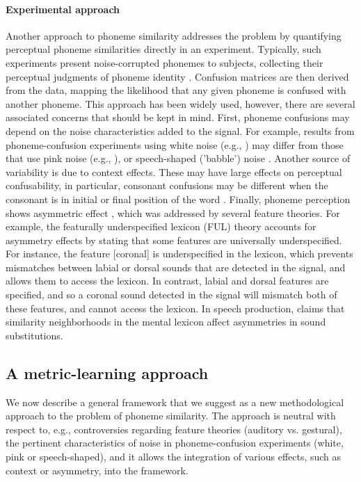\paragraph{Experimental approach}
Another approach to phoneme similarity addresses the problem by quantifying perceptual phoneme similarities directly in an experiment. Typically, such experiments present noise-corrupted phonemes to subjects, collecting their perceptual judgments of phoneme identity \citep{NicelyMiller1955}. Confusion matrices are then derived from the data, mapping the likelihood that any given phoneme is confused with another phoneme. This approach has been widely used, however, there are several associated concerns that should be kept in mind. First, phoneme confusions may depend on the noise characteristics added to the signal. For example, results from phoneme-confusion experiments using white noise (e.g., \citealp{NicelyMiller1955, Luce1987}) may differ from those that use pink noise (e.g., \citealp{redford1999relative}), or speech-shaped ('babble') noise \citep{cutler2004patterns}. Another source of variability is due to context effects. These may have large effects on perceptual confusability, in particular, consonant confusions may be different when the consonant is in initial or final position of the word \citep{Luce1987, hura1992role, redford1999relative}. Finally, phoneme perception shows asymmetric effect \citep{kuhl1991human}, which was addressed by several feature theories. For example, the featurally underspecified lexicon (FUL) theory \citep{lahiri2002underspecified, lahiri2010distinctive} accounts for asymmetry effects by stating that some features are universally underspecified. For instance, the feature [coronal] is underspecified in the lexicon, which prevents mismatches between labial or dorsal sounds that are detected in the signal, and allows them to access the lexicon. In contrast, labial and dorsal features are specified, and so a coronal sound detected in the signal will mismatch both of these features, and cannot access the lexicon. In speech production, \citet{Frisch1997} claims that similarity neighborhoods in the mental lexicon affect asymmetries in sound substitutions.

\subsection{A metric-learning approach}
We now describe a general framework that we suggest as a new methodological approach to the problem of phoneme similarity. The approach is neutral with respect to, e.g., controversies regarding feature theories (auditory vs. gestural), the pertinent characteristics of noise in phoneme-confusion experiments (white, pink or speech-shaped), and it allows the integration of various effects, such as context or asymmetry, into the framework.

